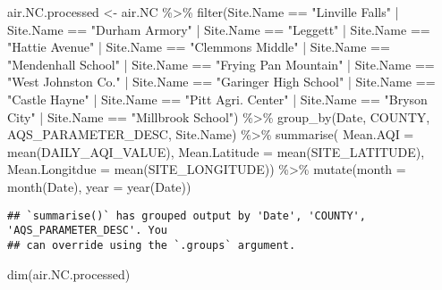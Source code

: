 \documentclass[
]{article}
\newenvironment{Shaded}{\begin{snugshade}}{\end{snugshade}}
\newcommand{\AttributeTok}[1]{\textcolor[rgb]{0.77,0.63,0.00}{#1}}
\newcommand{\FunctionTok}[1]{\textcolor[rgb]{0.00,0.00,0.00}{#1}}
\newcommand{\NormalTok}[1]{#1}
\newcommand{\OtherTok}[1]{\textcolor[rgb]{0.56,0.35,0.01}{#1}}
\newcommand{\SpecialCharTok}[1]{\textcolor[rgb]{0.00,0.00,0.00}{#1}}
\newcommand{\StringTok}[1]{\textcolor[rgb]{0.31,0.60,0.02}{#1}}
\begin{document}
\begin{Shaded}
\begin{Highlighting}[]
\NormalTok{air.NC.processed }\OtherTok{\textless{}{-}}\NormalTok{ air.NC }\SpecialCharTok{\%\textgreater{}\%} 
  \FunctionTok{filter}\NormalTok{(Site.Name }\SpecialCharTok{==} \StringTok{"Linville Falls"} \SpecialCharTok{|}\NormalTok{ Site.Name }\SpecialCharTok{==} \StringTok{"Durham Armory"} \SpecialCharTok{|}\NormalTok{ Site.Name }\SpecialCharTok{==} \StringTok{"Leggett"} \SpecialCharTok{|}\NormalTok{ Site.Name }\SpecialCharTok{==} \StringTok{"Hattie Avenue"} \SpecialCharTok{|}\NormalTok{ Site.Name }\SpecialCharTok{==} \StringTok{"Clemmons Middle"} \SpecialCharTok{|}\NormalTok{ Site.Name }\SpecialCharTok{==} \StringTok{"Mendenhall School"} \SpecialCharTok{|}\NormalTok{ Site.Name }\SpecialCharTok{==} \StringTok{"Frying Pan Mountain"} \SpecialCharTok{|}\NormalTok{ Site.Name }\SpecialCharTok{==} \StringTok{"West Johnston Co."} \SpecialCharTok{|}\NormalTok{ Site.Name }\SpecialCharTok{==} \StringTok{"Garinger High School"} \SpecialCharTok{|}\NormalTok{ Site.Name }\SpecialCharTok{==} \StringTok{"Castle Hayne"} \SpecialCharTok{|}\NormalTok{ Site.Name }\SpecialCharTok{==} \StringTok{"Pitt Agri. Center"} \SpecialCharTok{|}\NormalTok{ Site.Name }\SpecialCharTok{==} \StringTok{"Bryson City"} \SpecialCharTok{|}\NormalTok{ Site.Name }\SpecialCharTok{==} \StringTok{"Millbrook School"}\NormalTok{) }\SpecialCharTok{\%\textgreater{}\%}
  \FunctionTok{group\_by}\NormalTok{(Date, COUNTY, AQS\_PARAMETER\_DESC, Site.Name) }\SpecialCharTok{\%\textgreater{}\%}
  \FunctionTok{summarise}\NormalTok{( }\AttributeTok{Mean.AQI =} \FunctionTok{mean}\NormalTok{(DAILY\_AQI\_VALUE),}
             \AttributeTok{Mean.Latitude =} \FunctionTok{mean}\NormalTok{(SITE\_LATITUDE),}
             \AttributeTok{Mean.Longitdue =} \FunctionTok{mean}\NormalTok{(SITE\_LONGITUDE)) }\SpecialCharTok{\%\textgreater{}\%}
  \FunctionTok{mutate}\NormalTok{(}\AttributeTok{month =} \FunctionTok{month}\NormalTok{(Date), }\AttributeTok{year =} \FunctionTok{year}\NormalTok{(Date)) }
\end{Highlighting}
\end{Shaded}

\begin{verbatim}
## `summarise()` has grouped output by 'Date', 'COUNTY', 'AQS_PARAMETER_DESC'. You
## can override using the `.groups` argument.
\end{verbatim}

\begin{Shaded}
\begin{Highlighting}[]
\FunctionTok{dim}\NormalTok{(air.NC.processed)}
\end{Highlighting}
\end{Shaded}
\end{document}
